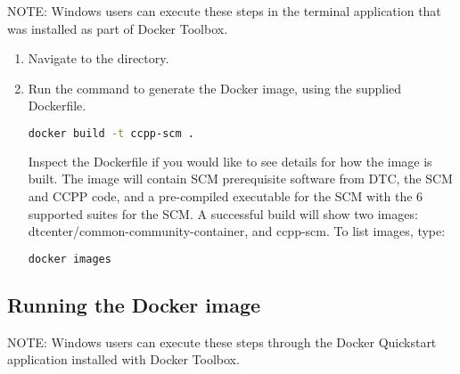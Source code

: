 NOTE: Windows users can execute these steps in the terminal application that was installed as part of Docker Toolbox.

\begin{enumerate}
\item Navigate to the  directory.
\item Run the  command to generate the Docker image, using the supplied Dockerfile.
\begin{lstlisting}[language=bash]
docker build -t ccpp-scm .
\end{lstlisting}
Inspect the Dockerfile if you would like to see details for how the image is built. The image will contain SCM prerequisite software from DTC, the SCM and CCPP code, and a pre-compiled executable for the SCM with the 6 supported suites for the SCM. A successful build will show two images: dtcenter/common-community-container, and ccpp-scm. To list images, type:
\begin{lstlisting}[language=bash]
docker images
\end{lstlisting}
\end{enumerate}

\subsection{Running the Docker image}

NOTE: Windows users can execute these steps through the Docker Quickstart application installed with Docker Toolbox.

